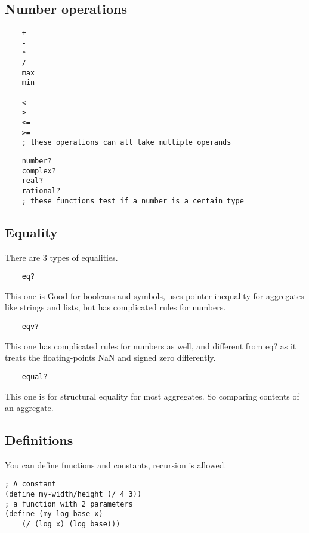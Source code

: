 \documentclass[12pt]{article}
\begin{document}
\subsection{Number operations}

\begin{lstlisting}
    +
    -
    *
    /
    max
    min
    -
    <
    >
    <=
    >=
    ; these operations can all take multiple operands
\end{lstlisting}

\begin{lstlisting}
    number?
    complex?
    real?
    rational?
    ; these functions test if a number is a certain type
\end{lstlisting}

\subsection{Equality}

There are 3 types of equalities.

\begin{lstlisting}
    eq?
\end{lstlisting}
	This one is Good for booleans and symbols, uses pointer inequality for aggregates like strings and lists, but has complicated rules for numbers.
	
\begin{lstlisting}
    eqv?
\end{lstlisting}
	This one has complicated rules for numbers as well, and different from eq? as it treats the floating-points NaN and signed zero differently.
	
	\begin{lstlisting}
    equal?
\end{lstlisting}
This one is for structural equality for most aggregates. So comparing contents of an aggregate.

\subsection{Definitions}

You can define functions and constants, recursion is allowed.

\begin{lstlisting}
; A constant
(define my-width/height (/ 4 3))
; a function with 2 parameters
(define (my-log base x)
	(/ (log x) (log base)))
    
\end{lstlisting}
\end{document}
